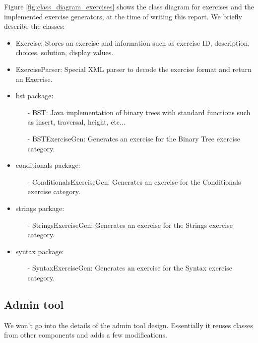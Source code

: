 Figure \ref{fig:class_diagram_exercises} shows the class diagram for exercises and the implemented exercise generators, at the time of writing this report. We briefly describe the classes:
\begin{itemize}
\item \textsf{Exercise}: Stores an exercise and information such as exercise ID, description, choices, solution, display values.
\item \textsf{ExerciseParser}: Special XML parser to decode the exercise format and return an \textsf{Exercise}.
\item \textsf{bst} package:
      \begin{itemize}
      \item[-] \textsf{BST}: Java implementation of binary trees with standard functions such as insert, traversal, height, etc...
      \item[-] \textsf{BSTExerciseGen}: Generates an exercise for the Binary Tree exercise category.
      \end{itemize}
\item \textsf{conditionals} package:
      \begin{itemize}
      \item[-] \textsf{ConditionalsExerciseGen}: Generates an exercise for the Conditionals exercise category.
      \end{itemize}
\item \textsf{strings} package:
      \begin{itemize}
      \item[-] \textsf{StringsExerciseGen}: Generates an exercise for the Strings exercise category.
      \end{itemize}
\item \textsf{syntax} package:
      \begin{itemize}
      \item[-] \textsf{SyntaxExerciseGen}: Generates an exercise for the Syntax exercise category.
      \end{itemize}                 
\end{itemize}

\subsection{Admin tool}
We won't go into the details of the admin tool design. Essentially it reuses classes from other components and adds a few modifications.\newline

